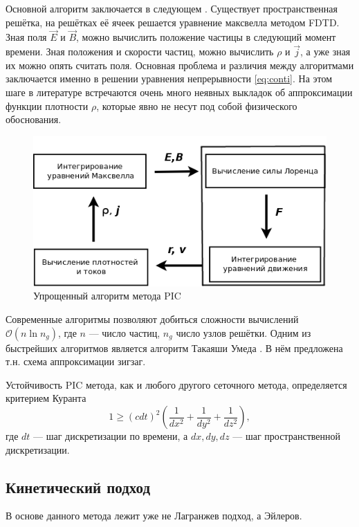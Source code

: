 Основной алгоритм заключается в следующем \cite{dawson1983particle}. Существует пространственная решётка, на решётках её ячеек решается уравнение максвелла методом FDTD.  Зная поля $\vec{E}$ и $\vec{B}$, можно вычислить положение частицы в следующий момент времени. Зная положения и скорости частиц, можно вычислить $\rho$ и $\vec{j}$, а уже зная их можно опять считать поля. Основная проблема и различия между алгоритмами заключается именно в решении уравнения непрерывности \eqref{eq:conti}. На этом шаге в литературе встречаются очень много неявных выкладок об аппроксимации функции плотности $\rho$, которые явно не несут под собой  физического обоснования.


\begin{figure}
\centering
\includegraphics[width=0.8\linewidth]{./fig/ch1/PIC_al}
\caption{Упрощенный алгоритм метода PIC}
\label{fig:PIC_al}
\end{figure}



Современные алгоритмы позволяют добиться сложности вычислений $\mathscr{O} \left( n \ln n_g \right)$, где $n$ --- число частиц, $n_g$ число узлов решётки. Одним из быстрейших алгоритмов является алгоритм Такаяши Умеда \cite{umeda2003new}. В нём предложена т.н. схема аппроксимации зигзаг.

Устойчивость PIC метода, как и любого другого сеточного метода, определяется критерием Куранта
\begin{equation}
1 \geqslant \left(c dt \right)^2 \left( \frac{1}{dx^2} + \frac{1}{dy^2} + \frac{1}{dz^2} \right),
\label{eq:Kurant}
\end{equation}
где $dt$ --- шаг дискретизации по времени, а $dx,dy,dz$ --- шаг пространственной дискретизации.


\subsection{Кинетический подход}

В основе данного метода лежит уже не Лагранжев подход, а Эйлеров. 

